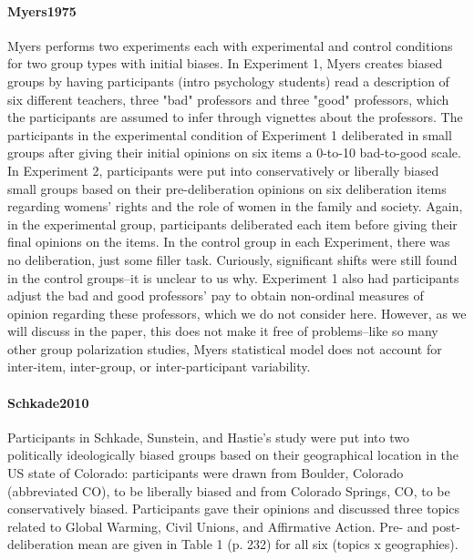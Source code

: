 \documentclass[12pt, letterpaper]{article}
\begin{document}
\paragraph{{Myers1975}} Myers performs two experiments each with experimental and control conditions for two group types with initial biases. In Experiment 1, Myers creates biased groups by having participants (intro psychology students) read a description of six different teachers, three "bad" professors and three "good" professors, which the participants are assumed to infer through vignettes about the professors. The participants in the experimental condition of Experiment 1 deliberated in small groups after giving their initial opinions on six items a 0-to-10 bad-to-good scale. In Experiment 2, participants were put into conservatively or liberally biased small groups based on their pre-deliberation opinions on six deliberation items regarding womens' rights and the role of women in the family and society. Again, in the experimental group, participants deliberated each item before giving their final opinions on the items. In the control group in each Experiment, there was no deliberation, just some filler task. Curiously, significant shifts were still found in the control groups--it is unclear to us why. Experiment 1 also had participants adjust the bad and good professors' pay to obtain non-ordinal measures of opinion regarding these professors, which we do not consider here. However, as we will discuss in the paper, this does not make it free of problems--like so many other group polarization studies, Myers statistical model does not account for inter-item, inter-group, or inter-participant variability.

\paragraph{{Schkade2010}} Participants in Schkade, Sunstein, and Hastie's study were put into two politically ideologically biased groups based on their geographical location in the US state of Colorado: participants were drawn from Boulder, Colorado (abbreviated CO), to be liberally biased and from Colorado Springs, CO, to be conservatively biased. Participants gave their opinions and discussed three topics related to Global Warming, Civil Unions, and Affirmative Action. Pre- and post-deliberation mean are given in Table 1 (p. 232) for all six (topics x geographies).  
\end{document}
